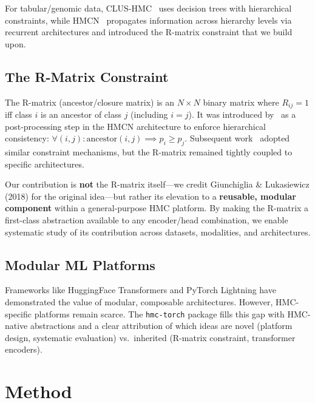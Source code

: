 \documentclass[11pt,a4paper]{article}
\begin{document}
For tabular/genomic data, CLUS-HMC~\cite{clus} uses decision trees
with hierarchical constraints, while HMCN~\cite{giunchiglia2018hmc}
propagates information across hierarchy levels via recurrent
architectures and introduced the R-matrix constraint that we build
upon.

\subsection{The R-Matrix Constraint}

The R-matrix (ancestor/closure matrix) is an $N \times N$ binary
matrix where $R_{ij} = 1$ iff class $i$ is an ancestor of class $j$
(including $i=j$). It was introduced by~\citet{giunchiglia2018hmc} as
a post-processing step in the HMCN architecture to enforce
hierarchical consistency: $\forall (i,j): \text{ancestor}(i,j)
\implies p_i \geq p_j$.  Subsequent work~\cite{zhou2020hiagm,
htcinfomax, www2022ontology} adopted similar constraint mechanisms,
but the R-matrix remained tightly coupled to specific architectures.

Our contribution is \textbf{not} the R-matrix itself---we credit
Giunchiglia \& Lukasiewicz (2018) for the original idea---but rather
its elevation to a \textbf{reusable, modular component} within a
general-purpose HMC platform. By making the R-matrix a first-class
abstraction available to any encoder/head combination, we enable
systematic study of its contribution across datasets, modalities, and
architectures.

\subsection{Modular ML Platforms}

Frameworks like HuggingFace Transformers and PyTorch Lightning have
demonstrated the value of modular, composable architectures. However,
HMC-specific platforms remain scarce. The \texttt{hmc-torch} package
fills this gap with HMC-native abstractions and a clear attribution of
which ideas are novel (platform design, systematic evaluation) vs.\
inherited (R-matrix constraint, transformer encoders).

\section{Method}
\end{document}
